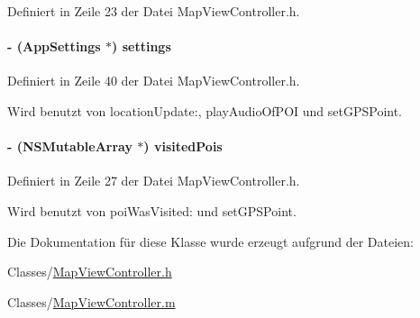 Definiert in Zeile 23 der Datei MapViewController.h.\hypertarget{interface_map_view_controller_a318f1f10cedf2e27f4ba6db3de2558b9}{
\paragraph[{settings}]{\setlength{\rightskip}{0pt plus 5cm}-\/ ({\bf AppSettings} $\ast$) settings}\hfill}
\label{interface_map_view_controller_a318f1f10cedf2e27f4ba6db3de2558b9}


Definiert in Zeile 40 der Datei MapViewController.h.

Wird benutzt von locationUpdate:, playAudioOfPOI und setGPSPoint.\hypertarget{interface_map_view_controller_aa496b5d41e4cd44cd9c910b980667dc1}{
\paragraph[{visitedPois}]{\setlength{\rightskip}{0pt plus 5cm}-\/ (NSMutableArray $\ast$) visitedPois}\hfill}
\label{interface_map_view_controller_aa496b5d41e4cd44cd9c910b980667dc1}


Definiert in Zeile 27 der Datei MapViewController.h.

Wird benutzt von poiWasVisited: und setGPSPoint.

Die Dokumentation für diese Klasse wurde erzeugt aufgrund der Dateien:\begin{DoxyCompactItemize}
\item 
Classes/\hyperlink{_map_view_controller_8h}{MapViewController.h}\item 
Classes/\hyperlink{_map_view_controller_8m}{MapViewController.m}\end{DoxyCompactItemize}
